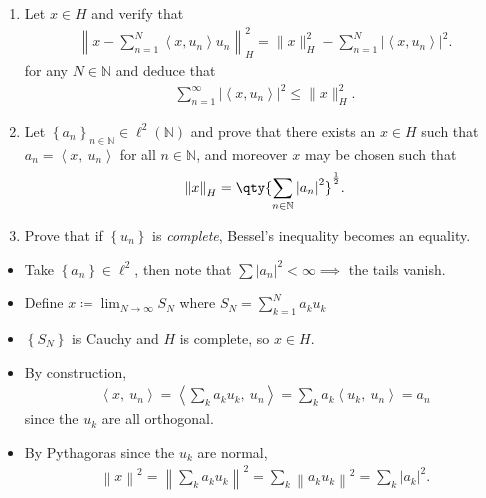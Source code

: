 \begin{enumerate}
\def\labelenumi{\alph{enumi}.}
\item
  Let \(x\in H\) and verify that
  \begin{align*}
  \left\|x-\sum_{n=1}^{N}\left\langle x, u_{n}\right\rangle u_{n}\right\|_H^{2}
  =
  \|x\|_H^{2}-\sum_{n=1}^{N}\left|\left\langle x, u_{n}\right\rangle\right|^{2}
  .\end{align*}
  for any \(N\in {\mathbb{N}}\) and deduce that
  \begin{align*}
  \sum_{n=1}^{\infty}\left|\left\langle x, u_{n}\right\rangle\right|^{2} \leq\|x\|_H^{2}
  .\end{align*}
\item
  Let
  \(\left\{{a_n}\right\}_{n\in {\mathbb{N}}} \in \ell^2({\mathbb{N}})\)
  and prove that there exists an \(x\in H\) such that
  \(a_n = {\left\langle {x},~{u_n} \right\rangle}\) for all
  \(n\in {\mathbb{N}}\), and moreover \(x\) may be chosen such that
  \begin{align*}
  {\left\lVert {x} \right\rVert}_H = \qty{ \sum_{n\in {\mathbb{N}}} {\left\lvert {a_n} \right\rvert}^2}^{1\over 2}
  .\end{align*}
\item
  Prove that if \(\left\{{u_n}\right\}\) is \emph{complete}, Bessel's
  inequality becomes an equality.
\end{enumerate}

\begin{solution}[part b]

\envlist

\begin{itemize}
\item
  Take \(\left\{{a_n}\right\} \in \ell^2\), then note that
  \(\sum {\left\lvert {a_n} \right\rvert}^2 < \infty \implies\) the
  tails vanish.
\item
  Define \(x \coloneqq\displaystyle\lim_{N\to\infty} S_N\) where
  \(S_N = \sum_{k=1}^N a_k u_k\)
\item
  \(\left\{{S_N}\right\}\) is Cauchy and \(H\) is complete, so
  \(x\in H\).
\item
  By construction,
  \begin{align*}
  {\left\langle {x},~{u_n} \right\rangle} = {\left\langle {\sum_k a_k u_k},~{u_n} \right\rangle} = \sum_k a_k {\left\langle {u_k},~{u_n} \right\rangle} = a_n 
  \end{align*}
  since the \(u_k\) are all orthogonal.
\item
  By Pythagoras since the \(u_k\) are normal,
  \begin{align*}
  {\left\lVert {x} \right\rVert}^2 = {\left\lVert {\sum_k a_k u_k} \right\rVert}^2 = \sum_k {\left\lVert {a_k u_k} \right\rVert}^2 = \sum_k {\left\lvert {a_k} \right\rvert}^2
  .\end{align*}
\end{itemize}

\end{solution}

